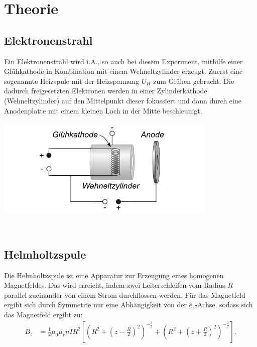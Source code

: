 \section{Theorie}
\subsection{Elektronenstrahl}
Ein Elektronenstrahl wird i.A., so auch bei diesem Experiment, mithilfe einer Glühkathode in Kombination mit einem Wehneltzylinder
erzeugt.
Zuerst eine sogenannte Heizspule mit der Heizspannung $U_H$ zum Glühen gebracht. Die dadurch freigesetzten Elektronen werden in einer
Zylinderkathode (Wehneltzylinder) auf den Mittelpunkt dieser fokussiert und dann durch eine Anodenplatte mit einem kleinen Loch in 
der Mitte beschleunigt.\\
\begin{minipage}{5cm}
\centering
\includegraphics{Elektronenkanone.png}
\end{minipage}\\

\subsection{Helmholtzspule}
Die Helmholtzspule ist eine Apparatur zur Erzeugung eines homogenen Magnetfeldes. Das wird erreicht, indem zwei Leiterschleifen vom 
Radius $R$ parallel zueinander von einem Strom durchflossen werden. Für das Magnetfeld ergibt sich durch Symmetrie nur eine Abhängigkeit
von der $\hat{e}_z$-Achse, sodass sich das Magnetfeld ergibt zu:
\begin{align}
B_{z} & = \frac{1}{2} \mu_{0} \mu_{r} n I R^2 \left[ \left( R^2+ \left( z - \frac{R}{2} \right)^2 \right)^{- \frac{3}{2}} + \left( R^2 + \left( z + \frac{R}{2} \right)^2 \right)^{- \frac{3}{2}} \right] \text{.} 
\end{align}

